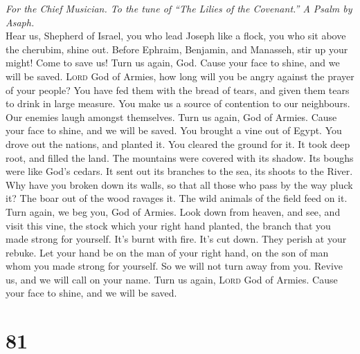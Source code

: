 \emph{For the Chief Musician. To the tune of ``The Lilies of the
Covenant.'' A Psalm by Asaph.}\\
 Hear us, Shepherd of Israel, you who lead Joseph like a
flock, you who sit above the cherubim, shine out.  Before
Ephraim, Benjamin, and Manasseh, stir up your might! Come to save us!
 Turn us again, God. Cause your face to shine, and we will
be saved.  \textsc{Lord} God of Armies, how long will you
be angry against the prayer of your people?  You have fed
them with the bread of tears, and given them tears to drink in large
measure.  You make us a source of contention to our
neighbours. Our enemies laugh amongst themselves.  Turn us
again, God of Armies. Cause your face to shine, and we will be saved.
 You brought a vine out of Egypt. You drove out the
nations, and planted it.  You cleared the ground for it.
It took deep root, and filled the land.  The mountains
were covered with its shadow. Its boughs were like God's cedars.
 It sent out its branches to the sea, its shoots to the
River.  Why have you broken down its walls, so that all
those who pass by the way pluck it?  The boar out of the
wood ravages it. The wild animals of the field feed on it.
 Turn again, we beg you, God of Armies. Look down from
heaven, and see, and visit this vine,  the stock which
your right hand planted, the branch that you made strong for yourself.
 It's burnt with fire. It's cut down. They perish at your
rebuke.  Let your hand be on the man of your right hand,
on the son of man whom you made strong for yourself.  So
we will not turn away from you. Revive us, and we will call on your
name.  Turn us again, \textsc{Lord} God of Armies. Cause
your face to shine, and we will be saved.

\hypertarget{section-80}{%
\section{81}\label{section-80}}

